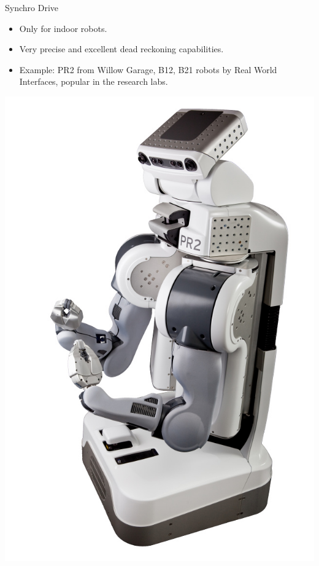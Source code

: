 \documentclass[compress]{beamer}
\begin{document}
\begin{frame}{Synchro Drive}

\begin{itemize}
    \item Only for indoor robots.
    \item Very precise and excellent dead reckoning capabilities.
    \item Example: PR2 from Willow Garage, B12, B21 robots by Real World
  Interfaces, popular in the research labs.
\end{itemize}

    \begin{center}
        \includegraphics[height=0.4\paperheight]{pr2}
        \hspace{1em}

\end{center}
\end{frame}
\end{document}
